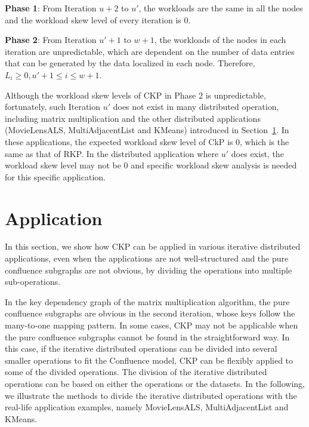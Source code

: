 \documentclass[10pt,journal,compsoc]{IEEEtran}
\begin{document}
\textbf{Phase 1}: From Iteration $u+2$ to $u'$, 
the workloads are the same in all the nodes and the workload skew level of every iteration is 0.

\textbf{Phase 2}: From Iteration $u'+1$ to $w+1$, 
the workloads of the nodes in each iteration are unpredictable, 
which are dependent on the number of data entries that can be generated by the data localized in each node. Therefore, $L_i \geq 0, u'+1 \leq i \leq w+1$.

Although the workload skew levels of CKP in Phase 2 is unpredictable,
fortunately, such Iteration $u'$ does not exist in many distributed operation, 
including matrix multiplication and the other distributed applications (MovieLensALS, MultiAdjacentList and KMeans) introduced in Section~\ref{section:application}. 
In these applications, the expected workload skew level of CkP is 0, which is the same as that of RKP.
In the distributed application where $u'$ does exist, the workload skew level may not be 0 and specific workload skew analysis is needed for this specific application.



\section{Application}\label{section:application}
In this section, we show how CKP can be applied in various
iterative distributed applications, even when the applications are not well-structured and the pure confluence subgraphs
are not obvious, by dividing the operations into multiple sub-operations.

In the key dependency graph of the matrix multiplication algorithm, 
the pure confluence subgraphs are obvious in the second iteration, 
whose keys follow the many-to-one mapping pattern.
In some cases, CKP may not be applicable when
the pure confluence subgraphs cannot be found%
in the straightforward way.
In this case, if the iterative distributed operations can be divided into several smaller operations to fit the Confluence model, 
CKP can be flexibly applied to some of the divided operations.
The division of the iterative distributed operations can be based on either the operations or the datasets. 
In the following, we illustrate the methods to divide the iterative
distributed operations with the real-life application examples, 
namely MovieLensALS, MultiAdjacentList and KMeans.
\end{document}
